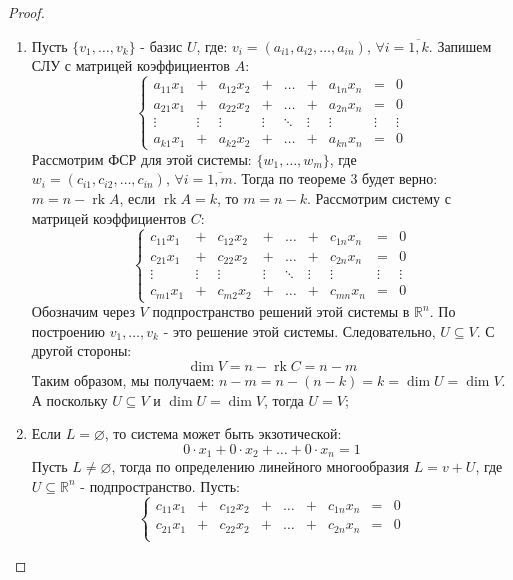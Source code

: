 \documentclass[12pt]{article}
\newcommand{\MR}{\mathbb{R}}
\newcommand{\VN}{\varnothing}
\theoremstyle{definition}
\DeclareMathOperator{\rk}{\text{rk}}
\begin{document}
\begin{proof}
	\hfill
	\begin{enumerate}[label=\arabic*)]
		\item Пусть $\{v_1,\dotsc, v_k\}$ - базис $U$, где: $v_i = (a_{i1}, a_{i2},\dotsc,a_{in}), \, \forall i = \overline{1,k}$. Запишем СЛУ с матрицей коэффициентов $A$:
		$$
			\left\{
				\begin{array}{ccccccccc}
					a_{11}x_1 &+& a_{12}x_2 &+& \dotsc &+& a_{1n}x_n &=& 0\\
					a_{21}x_1 &+& a_{22}x_2 &+& \dotsc &+& a_{2n}x_n &=& 0\\
					\vdots &\vdots& \vdots & \vdots & \ddots &\vdots& \vdots &\vdots & \vdots\\
					a_{k1}x_1 &+& a_{k2}x_2 &+& \dotsc &+& a_{kn}x_n &=& 0
				\end{array}
			\right.
		$$
		Рассмотрим ФСР для этой системы: $\{w_1,\dotsc, w_m\}$, где $w_i = (c_{i1}, c_{i2}, \dotsc, c_{in}), \, \forall i =\overline{1,m}$. Тогда по теореме $3$ будет верно: $m = n -\rk{A}$, если $\rk{A} = k$, то $m = n - k$. Рассмотрим систему с матрицей коэффициентов $C$:
		$$
			\left\{
				\begin{array}{ccccccccc}
					c_{11}x_1 &+& c_{12}x_2 &+& \dotsc &+& c_{1n}x_n &=& 0\\
					c_{21}x_1 &+& c_{22}x_2 &+& \dotsc &+& c_{2n}x_n &=& 0\\
					\vdots &\vdots& \vdots & \vdots & \ddots &\vdots& \vdots &\vdots & \vdots\\
					c_{m1}x_1 &+& c_{m2}x_2 &+& \dotsc &+& c_{mn}x_n &=& 0
				\end{array}
			\right.
		$$
		Обозначим через $V$ подпространство решений этой системы в $\MR^n$. По построению $v_1, \dotsc, v_k$ - это решение этой системы. Следовательно, $U \subseteq V$. С другой стороны: 
		$$
			\dim{V} = n - \rk{C} = n - m
		$$
		Таким образом, мы получаем: $n - m = n - (n - k) = k = \dim{U} = \dim{V}$. А поскольку $U \subseteq V$ и $\dim{U} = \dim{V}$, тогда $U = V$;
		\item Если $L = \VN$, то система может быть экзотической:
		$$
			0{\cdot}x_1 + 0{\cdot}x_2 + \dotsc + 0{\cdot}x_n = 1
		$$
		Пусть $L \neq \VN$, тогда по определению линейного многообразия $L = v + U$, где $U \subseteq \MR^n$ - подпространство. Пусть:
		$$
			\left\{
				\begin{array}{ccccccccc}
					c_{11}x_1 &+& c_{12}x_2 &+& \dotsc &+& c_{1n}x_n &=& 0\\
					c_{21}x_1 &+& c_{22}x_2 &+& \dotsc &+& c_{2n}x_n &=& 0\\

\end{array}$$
\end{enumerate}
\end{proof}
\end{document}
